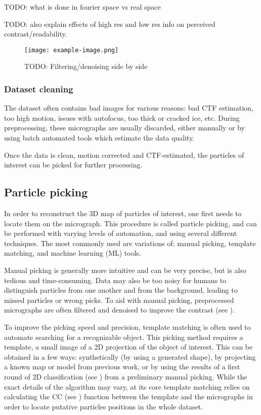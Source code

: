 TODO: what is done in fourier space vs real space

TODO: also explain effects of high res and low res info on perceived contrast/readability.

\begin{figure}[ht]
    \centering
    \texttt{[image: example-image.png]}
    \caption{TODO: Filtering/denoising side by side}
    \label{fig:em_filtering}
\end{figure}

\subsubsection{Dataset cleaning}
The dataset often contains bad images for various reasons: bad CTF estimation, too high motion, issues with autofocus, too thick or cracked ice, etc.
During preprocessing, these micrographs are usually discarded, either manually or by using batch automated tools which estimate the data quality.

Once the data is clean, motion corrected and CTF-estimated, the particles of interest can be picked for further processing.

\subsection{Particle picking}\label{em_particle_picking}
In order to reconstruct the 3D map of particles of interest, one first needs to locate them on the micrograph.
This procedure is called particle picking, and can be performed with varying levels of automation, and using several different techniques.
The most commonly used are variations of: manual picking, template matching, and machine learning (ML) tools.

Manual picking is generally more intuitive and can be very precise, but is also tedious and time-consuming.
Data may also be too noisy for humans to distinguish particles from one another and from the background, leading to missed particles or wrong picks.
To aid with manual picking, preprocessed micrographs are often filtered and denoised to improve the contrast (see ).

To improve the picking speed and precision, template matching is often used to automate searching for a recognizable object.
This picking method requires a template, a small image of a 2D projection of the object of interest.
This can be obtained in a few ways: synthetically (by using a generated shape), by projecting a known map or model from previous work, or by using the results of a first round of 2D classification (see ) from a preliminary manual picking.
While the exact details of the algorithm may vary, at its core template matching relies on calculating the CC (see ) function between the template and the micrographs in order to locate putative particles positions in the whole dataset.

